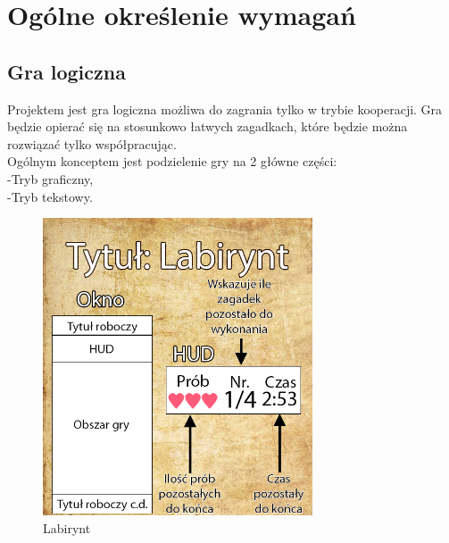 	\newpage
\section{Ogólne określenie wymagań}		%















\subsection{Gra logiczna}  %

Projektem jest gra logiczna możliwa do zagrania tylko w trybie kooperacji. Gra będzie opierać się na stosunkowo łatwych zagadkach, które będzie można rozwiązać tylko współpracując.
\\Ogólnym konceptem jest podzielenie gry na 2 główne części:
\\\hspace{0.60cm}-Tryb graficzny,
\\\hspace{0.60cm}-Tryb tekstowy.


%

	\begin{figure}[!htb]
	\begin{center}
		\includegraphics[width=8cm]{rys/gra1.png}
		\caption{Labirynt}
		\label{rys:rysunek001}
	\end{center}
\end{figure}

